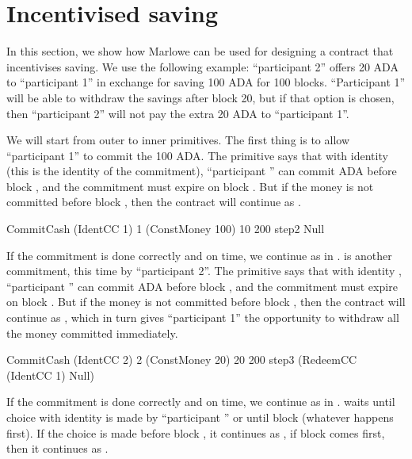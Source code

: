 \documentclass[
      acmsmall
    , screen
  ]{acmart}
\begin{document}
\section{Incentivised saving}
\label{section:example-saving}

In this section, we show how Marlowe can be used for designing a contract that incentivises saving. We use the 
following example: ``participant 2'' offers 20 ADA to ``participant 1'' in exchange for saving 100 ADA for 100 blocks. 
``Participant 1'' will be able to withdraw the savings after block 20, but if that option is chosen, then ``participant 
2'' will not pay the extra 20 ADA to ``participant 1''.

We will start from outer to inner primitives. The first thing is to allow ``participant 1'' to commit the 100 ADA. The 
primitive says that with identity  (this is the identity of the commitment), ``participant 
'' can commit  ADA before block , and the commitment must 
expire on block . But if the money is not committed before block , then the 
contract will continue as .

\begin{haskellcode}
CommitCash (IdentCC 1) 1 (ConstMoney 100) 10 200
           step2
           Null
\end{haskellcode}

If the commitment is done correctly and on time, we continue as in .  is 
another commitment, this time by ``participant 2''. The primitive says that with identity ,
``participant '' can commit  ADA before block , and the commitment
must expire on block . But if the money is not committed before block , then the
contract will continue as , which in turn gives ``participant 1'' the 
opportunity to withdraw all the money committed immediately.

\begin{haskellcode}
CommitCash (IdentCC 2) 2 (ConstMoney 20) 20 200
           step3
           (RedeemCC (IdentCC 1) Null)
\end{haskellcode}

If the commitment is done correctly and on time, we continue as in . 
waits until choice with identity  is made by ``participant '' or
until block  (whatever happens first). If the choice is made before block , 
it continues as , if block  comes first, then it continues as 
.
\end{document}

